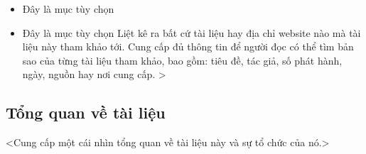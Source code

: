 \begin{itemize}
    \item Đây là mục tùy chọn
    \item Đây là mục tùy chọn 
Liệt kê ra bất cứ tài liệu hay địa chỉ website nào mà tài liệu này tham khảo tới. Cung cấp đủ 
thông tin để người đọc có thể tìm bản sao của từng tài liệu tham khảo, bao gồm: tiêu đề, 
tác giả, số phát hành, ngày, nguồn hay nơi cung cấp. > 
\end{itemize}

\subsection{Tổng quan về tài liệu}
<Cung cấp một cái nhìn tổng quan về tài liệu này và sự tổ chức của nó.>

